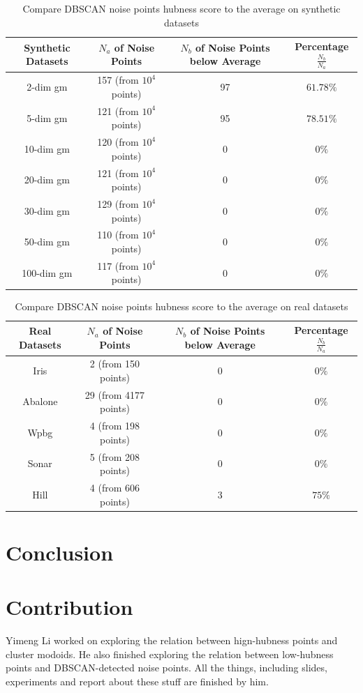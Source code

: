 \documentclass[11pt]{article}
\begin{document}
\begin{table}
\begin{center}
	\begin{tabular}{||c c c c||}
	\hline
	Synthetic Datasets & $N_{a}$ of Noise Points& $N_{b}$ of Noise Points below Average & Percentage $\frac{N_{b}}{N_{a}}$\\[0.5ex]
	\hline
	\hline
	2-dim gm & 157 (from $10^4$ points) & 97 & $61.78\%$\\
	\hline
	5-dim gm & 121 (from $10^4$ points) & 95 & $78.51\%$\\
	\hline
	10-dim gm & 120 (from $10^4$ points) & 0 & $0\%$\\
	\hline
	20-dim gm & 121 (from $10^4$ points) & 0 & $0\%$\\
	\hline
	30-dim gm & 129 (from $10^4$ points) & 0 & $0\%$\\
	\hline
	50-dim gm & 110 (from $10^4$ points) & 0 & $0\%$\\
	\hline
	100-dim gm & 117 (from $10^4$ points) & 0 & $0\%$\\
	\hline
\end{tabular}
\caption{Compare DBSCAN noise points hubness score to the average on synthetic datasets}
\end{center}
\label{tab:noise1}
\end{table} 

\begin{table}
\begin{center}
	\begin{tabular}{||c c c c||}
	\hline
	Real Datasets & $N_{a}$ of Noise Points & $N_{b}$ of Noise Points below Average & Percentage $\frac{N_{b}}{N_{a}}$\\[0.5ex]
	\hline
	\hline
	Iris & 2 (from 150 points) & 0 & $0\%$\\
	\hline
	Abalone & 29 (from 4177 points) & 0 & $0\%$\\
	\hline
	Wpbg & 4 (from 198 points) & 0 & $0\%$\\
	\hline
	Sonar & 5 (from 208 points) & 0 & $0\%$\\
	\hline
	Hill & 4 (from 606 points) & 3 & $75\%$\\
	\hline
\end{tabular}
\caption{Compare DBSCAN noise points hubness score to the average on real datasets}
\end{center}
\label{tab:noise2}
\end{table} 


\section{Conclusion}

\section{Contribution}
Yimeng Li worked on exploring the relation between hign-hubness points and cluster modoids. He also finished exploring the relation between low-hubness points and DBSCAN-detected noise points. All the things, including slides, experiments and report about these stuff are finished by him.


\end{document}
